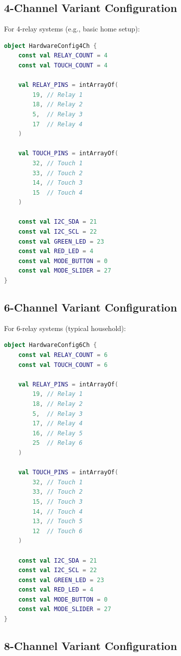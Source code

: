 \subsection{4-Channel Variant Configuration}

For 4-relay systems (e.g., basic home setup):

\begin{lstlisting}[language=Kotlin, caption=4-Channel GPIO Configuration, label=lst:gpio_4ch]
object HardwareConfig4Ch {
    const val RELAY_COUNT = 4
    const val TOUCH_COUNT = 4
    
    val RELAY_PINS = intArrayOf(
        19, // Relay 1
        18, // Relay 2
        5,  // Relay 3
        17  // Relay 4
    )
    
    val TOUCH_PINS = intArrayOf(
        32, // Touch 1
        33, // Touch 2
        14, // Touch 3
        15  // Touch 4
    )
    
    const val I2C_SDA = 21
    const val I2C_SCL = 22
    const val GREEN_LED = 23
    const val RED_LED = 4
    const val MODE_BUTTON = 0
    const val MODE_SLIDER = 27
}
\end{lstlisting}

\subsection{6-Channel Variant Configuration}

For 6-relay systems (typical household):

\begin{lstlisting}[language=Kotlin, caption=6-Channel GPIO Configuration, label=lst:gpio_6ch]
object HardwareConfig6Ch {
    const val RELAY_COUNT = 6
    const val TOUCH_COUNT = 6
    
    val RELAY_PINS = intArrayOf(
        19, // Relay 1
        18, // Relay 2
        5,  // Relay 3
        17, // Relay 4
        16, // Relay 5
        25  // Relay 6
    )
    
    val TOUCH_PINS = intArrayOf(
        32, // Touch 1
        33, // Touch 2
        15, // Touch 3
        14, // Touch 4
        13, // Touch 5
        12  // Touch 6
    )
    
    const val I2C_SDA = 21
    const val I2C_SCL = 22
    const val GREEN_LED = 23
    const val RED_LED = 4
    const val MODE_BUTTON = 0
    const val MODE_SLIDER = 27
}
\end{lstlisting}

\subsection{8-Channel Variant Configuration}

